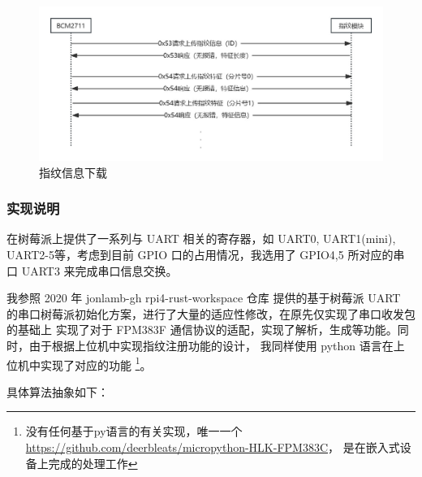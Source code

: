     \begin{figure}[H]
        \centering
        \caption{指纹信息下载}    \label{FPM383F::DownloadFingerPrintInfo}
        \includegraphics[scale=0.4]{./imgs/指纹信息下载.jpg}
    \end{figure}    

    \subsubsection{实现说明}

    在树莓派上提供了一系列与 UART 相关的寄存器，如 UART0, UART1(mini), 
    UART2-5等，考虑到目前 GPIO 口的占用情况，我选用了 GPIO4,5 所对应的串口
    UART3 来完成串口信息交换。

    我参照 2020 年 jonlamb-gh rpi4-rust-workspace 仓库\cite{rpi4-rust-workspace}
    提供的基于树莓派 UART 的串口树莓派初始化方案，进行了大量的适应性修改，在原先仅实现了串口收发包的基础上
    实现了对于 FPM383F 通信协议的适配，实现了解析，生成等功能。同时，由于根据上位机中实现指纹注册功能的设计，
    我同样使用 python 语言在上位机中实现了对应的功能
    \footnote{没有任何基于py语言的有关实现，唯一一个\href{micropython-HLK-FPM383C}{https://github.com/deerbleats/micropython-HLK-FPM383C}， 是在嵌入式设备上完成的处理工作}。

    具体算法抽象如下：

